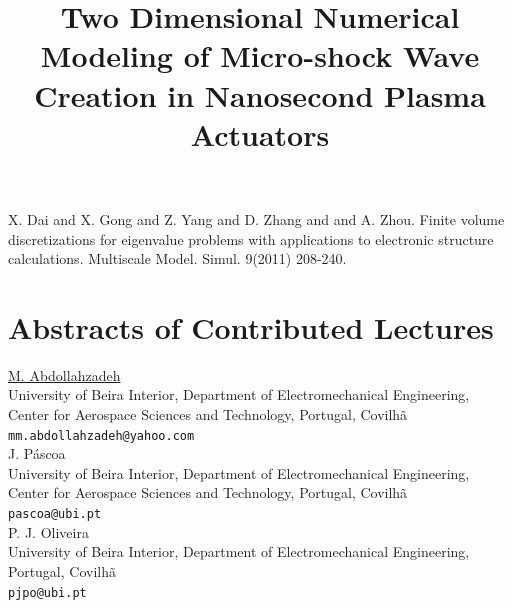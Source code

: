 \documentclass[article, A4, 11pt]{llncs}%
\begin{document}

\begin{thebibliography}{10}
{\sc X. Dai and X. Gong and Z. Yang and D. Zhang and and A. Zhou}. {Finite volume discretizations for eigenvalue problems with applications to electronic structure calculations}. Multiscale Model. Simul. 9(2011) 208-240.
\end{thebibliography} %

\newpage

\part{Abstracts of Contributed Lectures}

\title{Two Dimensional Numerical Modeling of Micro-shock Wave Creation in Nanosecond Plasma Actuators}
 \author{} \institute{}
\maketitle
\begin{center}
{\large \underline{M. Abdollahzadeh}}\\
University of Beira Interior, Department of Electromechanical Engineering, Center for Aerospace Sciences and Technology, Portugal, Covilhã\\
{\tt mm.abdollahzadeh@yahoo.com}
\\ \vspace{4mm}
{\large J. Páscoa}\\
University of Beira Interior, Department of Electromechanical Engineering, Center for Aerospace Sciences and Technology, Portugal, Covilhã\\
{\tt pascoa@ubi.pt}
\\ \vspace{4mm}
{\large P. J. Oliveira}\\
University of Beira Interior, Department of Electromechanical Engineering, Portugal, Covilhã\\
{\tt pjpo@ubi.pt}
\end{center}
\end{document}
